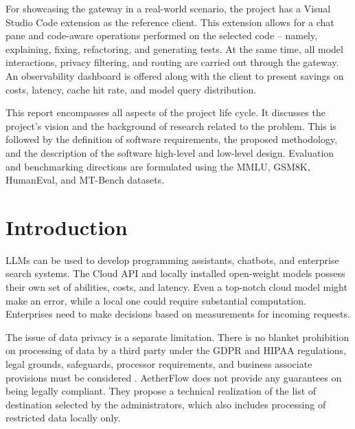 \documentclass{FastFyp}
\begin{document}
For showcasing the gateway in a real-world scenario, the project has a Visual Studio Code extension as the reference client. This extension allows for a chat pane and code-aware operations performed on the selected code – namely, explaining, fixing, refactoring, and generating tests. At the same time, all model interactions, privacy filtering, and routing are carried out through the gateway. An observability dashboard is offered along with the client to present savings on costs, latency, cache hit rate, and model query distribution.

This report encompasses all aspects of the project life cycle. It discusses the project’s vision and the background of research related to the problem. This is followed by the definition of software requirements, the proposed methodology, and the description of the software high-level and low-level design. Evaluation and benchmarking directions are formulated using the MMLU, GSM8K, HumanEval, and MT-Bench datasets.
\pagebreak

\pagestyle{fancy} %
\tableofcontents

\pagebreak
\listoffigures	%
\pagebreak
{}
{}
\listoftables %

\mainmatter

\chapter{Introduction}
\label{ch:introduction}

LLMs can be used to develop programming assistants, chatbots, and enterprise search systems. The Cloud API and locally installed open-weight models possess their own set of abilities, costs, and latency. Even a top-notch cloud model might make an error, while a local one could require substantial computation. Enterprises need to make decisions based on measurements for incoming requests.

The issue of data privacy is a separate limitation. There is no blanket prohibition on processing of data by a third party under the GDPR and HIPAA regulations, legal grounds, safeguards, processor requirements, and business associate provisions must be considered \cite{ref:GDPR,ref:HIPAA}. AetherFlow does not provide any guarantees on being legally compliant. They propose a technical realization of the list of destination selected by the administrators, which also includes processing of restricted data locally only.
\end{document}
